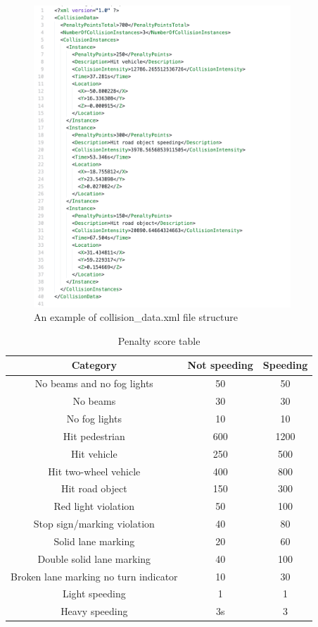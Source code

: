 \begin{figure}
    \centering
    \includegraphics[width = 0.86\textwidth]{research_paper/Images/collision_data.png}
    \caption{An example of collision\_data.xml file structure}
    \label{fig:collision_data}
\end{figure}

\begin{table}
    \centering
    \begin{tabular}{||c c c||} 
         \hline
 \textbf{Category} & \textbf{Not speeding} & \textbf{Speeding} \\ [0.5ex] 
 \hline\hline
No beams and no fog lights & 50 & 50 \\
No beams & 30 & 30 \\
No fog lights & 10 & 10 \\
Hit pedestrian & 600 & 1200 \\
Hit vehicle & 250 & 500 \\
Hit two-wheel vehicle & 400 & 800 \\
Hit road object & 150 & 300 \\
Red light violation & 50 & 100 \\
Stop sign/marking violation & 40 & 80 \\
Solid lane marking & 20 & 60 \\
Double solid lane marking & 40 & 100 \\
Broken lane marking no turn indicator & 10 & 30 \\
Light speeding & 1 & 1 \\
Heavy speeding & 3s & 3 \\
 \hline
    \end{tabular}
    \caption{Penalty score table}
    \label{tab:penalty_values}
\end{table}

